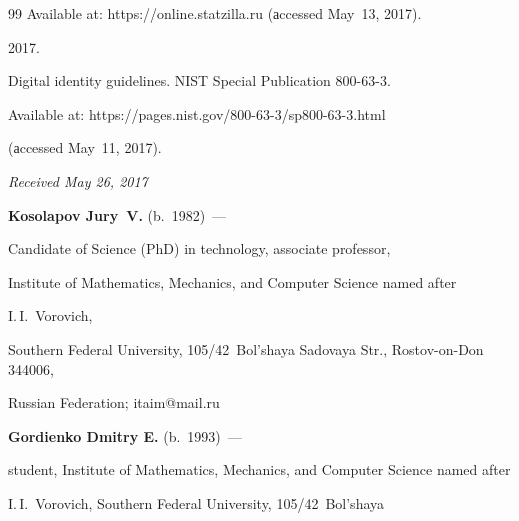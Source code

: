{{\begin{thebibliography}{99}
Available at: {\sf https://online.statzilla.ru} (аccessed May~13, 2017).






2017.  


Digital identity guidelines.  NIST Special Publication 800-63-3.


Available at: {\sf https://pages.nist.gov/800-63-3/\linebreak  sp800-63-3.html} 


(аccessed May~11, 2017).


\end{thebibliography}


} }








\vspace*{-3pt}





\hfill{\small\textit{Received May 26, 2017}} 





\Contr





\noindent


\textbf{Kosolapov Jury~V.} (b.\ 1982)~--- 


Candidate of Science (PhD) in technology, associate professor, 


Institute of Mathematics, Mechanics, and Computer Science named after 


 I.\,I.~Vorovich, 


Southern Federal University, 105/42~Bol'shaya Sadovaya Str., Rostov-on-Don 344006, 


Russian Federation; \mbox{itaim@mail.ru} 





\vspace*{3pt}





\noindent


\textbf{Gordienko Dmitry E.} (b.\ 1993)~--- 


student, Institute of Mathematics, Mechanics, and Computer Science named after 


 I.\,I.~Vorovich, Southern Federal University, 105/42~Bol'shaya 


